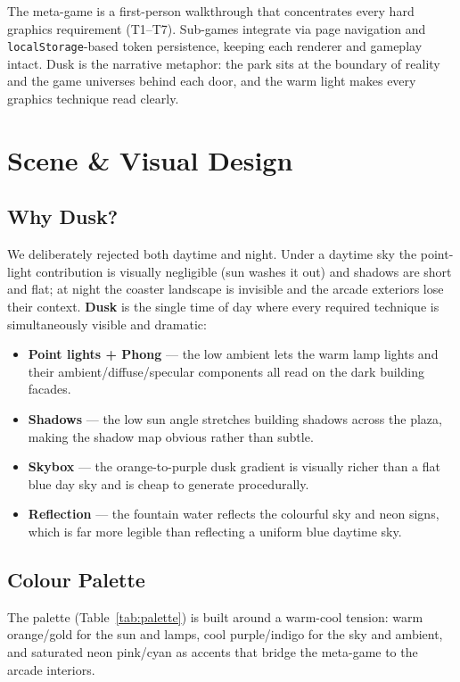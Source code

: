 \documentclass[10pt,a4paper]{article}
\begin{document}
The meta-game is a first-person walkthrough that concentrates every hard graphics
requirement (T1--T7). Sub-games integrate via page navigation and
\texttt{localStorage}-based token persistence, keeping each renderer and gameplay intact.
Dusk is the narrative metaphor: the park sits at the boundary of reality and the game
universes behind each door, and the warm light makes every graphics technique read clearly.

\section{Scene \& Visual Design}

\subsection{Why Dusk?}

We deliberately rejected both daytime and night. Under a daytime sky the point-light
contribution is visually negligible (sun washes it out) and shadows are short and flat; at
night the coaster landscape is invisible and the arcade exteriors lose their context.
\textbf{Dusk} is the single time of day where every required technique is simultaneously
visible and dramatic:

\begin{itemize}[nosep]
  \item \textbf{Point lights + Phong} --- the low ambient lets the warm lamp lights and
    their ambient/diffuse/specular components all read on the dark building facades.
  \item \textbf{Shadows} --- the low sun angle stretches building shadows across the plaza,
    making the shadow map obvious rather than subtle.
  \item \textbf{Skybox} --- the orange-to-purple dusk gradient is visually richer than a
    flat blue day sky and is cheap to generate procedurally.
  \item \textbf{Reflection} --- the fountain water reflects the colourful sky and neon
    signs, which is far more legible than reflecting a uniform blue daytime sky.
\end{itemize}

\subsection{Colour Palette}

The palette (Table~\ref{tab:palette}) is built around a warm-cool tension: warm
orange/gold for the sun and lamps, cool purple/indigo for the sky and ambient, and
saturated neon pink/cyan as accents that bridge the meta-game to the arcade interiors.
\end{document}

